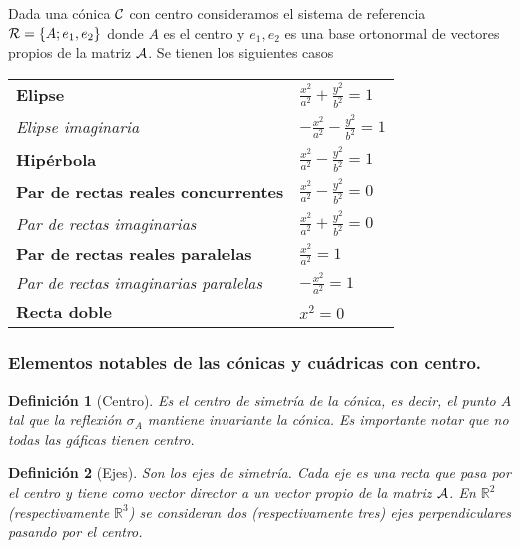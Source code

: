 \documentclass[11pt, a4paper, titlepage]{article}
\theoremstyle{theorem-style}
\theoremstyle{definition-style}
\newtheorem*{ndef}{Definición}
\theoremstyle{remark-style}
\theoremstyle{example-style}
\begin{document}
\vspace{.5cm}

Dada una c\'onica $\cal C$ con centro consideramos el sistema de referencia 
${\cal R}=\{A; e_1,e_2\}$ donde $A$ 
es el centro y $e_1,e_2$ es una base ortonormal de vectores propios de la matriz $\cal A$. Se tienen los siguientes casos

\vspace{.8cm}

\begin{tabular}{ll}
{\bf Elipse} \hspace{5cm} & 
$
\frac{{x}^2}{a^2} + \frac{{y}^2}{b^2} = 1
$
\vspace{.4cm}
\\
{\it Elipse imaginaria}  &
$
-\frac{{x}^2}{a^2} - \frac{{y}^2}{b^2} = 1
$
\vspace{.4cm}
\\
{\bf  Hip\'erbola}  &
$
\frac{{x}^2}{a^2} - \frac{{y}^2}{b^2} = 1
$
\vspace{.4cm}
\\
{\bf  Par de rectas reales concurrentes}  &
$
\frac{{x}^2}{a^2} - \frac{{y}^2}{b^2}=0
$
\vspace{.4cm}
\\
{\it Par de rectas imaginarias} &
$
\frac{{x}^2}{a^2} + \frac{{y}^2}{b^2}=0
$
\vspace{.4cm}
\\
{\bf  Par de rectas reales paralelas}  &
$
\frac{{x}^2}{a^2}=1
$
\vspace{.4cm}
\\
{\it Par de rectas imaginarias paralelas}  &
$
-\frac{{x}^2}{a^2} = 1
$
\vspace{.4cm}
\\
{\bf  Recta doble}  &
$
{{x}^2} = 0
$
\vspace{.3cm}
\\
\end{tabular}
\subsubsection{\bf  Elementos notables de las c\'onicas y cu\'adricas con centro.}

\begin{ndef}[Centro]
	Es el centro de simetría de la cónica, es decir, el punto $A$ tal que la reflexión $\sigma_A$ mantiene invariante la cónica. Es importante notar que no todas las gáficas tienen centro.
\end{ndef}


\begin{ndef}[Ejes]
	 Son los ejes de simetr\'ia. Cada eje es una recta que pasa por el centro y tiene como vector director a un vector propio de la matriz $\cal A$. En $\mathbb{R}^2$ (respectivamente $\mathbb{R}^3$) se consideran dos (respectivamente tres)  ejes perpendiculares pasando por el centro.
\end{ndef}
\end{document}
